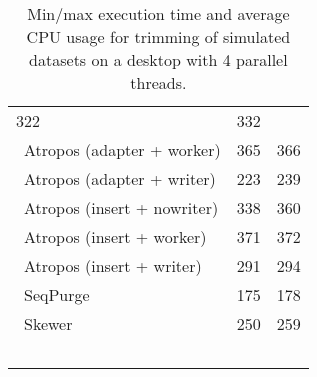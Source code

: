 \begin{table}[ht]
\begin{tabular}{lr|r}
        322
        & 332
        
        \\\    
        Atropos (adapter + worker) &
        
        365
        & 366
        
        \\\    
        Atropos (adapter + writer) &
        
        223
        & 239
        
        \\\    
        Atropos (insert + nowriter) &
        
        338
        & 360
        
        \\\    
        Atropos (insert + worker) &
        
        371
        & 372
        
        \\\    
        Atropos (insert + writer) &
        
        291
        & 294
        
        \\\    
        SeqPurge &
        
        175
        & 178
        
        \\\    
        Skewer &
        
        250
        & 259
        
        \\\    
\end{tabular}
\caption{Min/max execution time and average CPU usage for trimming of simulated datasets on a desktop with 4 parallel threads.\label{tab:simulated-performance-local}}
\end{table}
